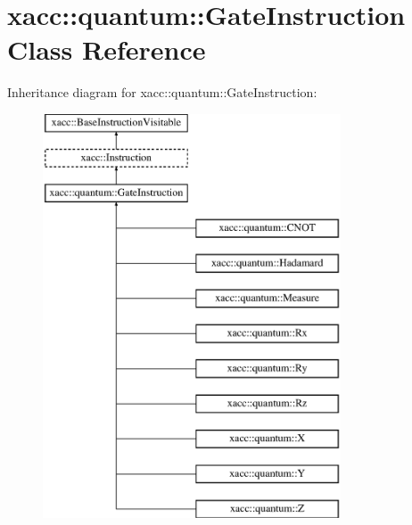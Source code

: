 \hypertarget{a00112}{}\section{xacc\+:\+:quantum\+:\+:Gate\+Instruction Class Reference}
\label{a00112}
Inheritance diagram for xacc\+:\+:quantum\+:\+:Gate\+Instruction\+:\begin{figure}[H]
\begin{center}
\leavevmode
\includegraphics[height=12.000000cm]{a00112}
\end{center}
\end{figure}
